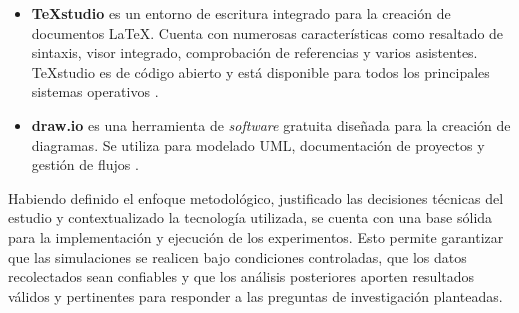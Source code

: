 \begin{itemize}
	\item\textbf{TeXstudio} es un entorno de escritura integrado para la creación de documentos LaTeX. Cuenta con numerosas características como resaltado de sintaxis, visor integrado, comprobación de referencias y varios asistentes. TeXstudio es de código abierto y está disponible para todos los principales sistemas operativos \cite{texstudio}.
	
	\item \textbf{draw.io} es una herramienta de \textit{software} gratuita diseñada para la creación de diagramas. Se utiliza para modelado UML, documentación de proyectos y gestión de flujos \cite{drawio2024}.
	
\end{itemize}

Habiendo definido el enfoque metodológico, justificado las decisiones técnicas del estudio y contextualizado la tecnología utilizada, se cuenta con una base sólida para la implementación y ejecución de los experimentos. Esto permite garantizar que las simulaciones se realicen bajo condiciones controladas, que los datos recolectados sean confiables y que los análisis posteriores aporten resultados válidos y pertinentes para responder a las preguntas de investigación planteadas.
